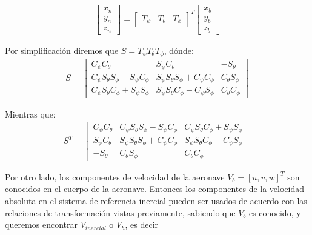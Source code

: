 \begin{gather}
    \begin{bmatrix}
    x_{n}\\
    y_{n}\\
    z_{n}
    \end{bmatrix}
    =
    \begin{bmatrix}
    T_{\psi} & T_{\theta} & T_{\phi} 
    \end{bmatrix} ^T
    \begin{bmatrix}
    x_{b}\\
    y_{b}\\
    z_{b}
    \end{bmatrix}
\end{gather}

Por simplificación diremos que $S = T_{\psi} T_{\theta} T_{\phi}$, dónde:
\begin{gather}
    S
    =
    \begin{bmatrix}
    C_{\psi} C_{\theta} & S_{\psi} C_{\theta} & -S_{\theta}\\
    C_{\psi} S_{\theta} S_{\phi} - S_{\psi} C_{\phi} & S_{\psi} S_{\theta} S_{\phi} + C_{\psi} C_{\phi} & C_{\theta} S_{\phi} \\
    C_{\psi} S_{\theta} C_{\phi} + S_{\psi} S_{\phi} & S_{\psi} S_{\theta} C_{\phi} - C_{\psi} S_{\phi} & C_{\theta} C_{\phi}
    \end{bmatrix}
\end{gather}

Mientras que:
\begin{gather}
    S^T 
    =
    \begin{bmatrix}
    C_{\psi} C_{\theta} & C_{\psi} S_{\theta} S_{\phi} - S_{\psi} C_{\phi} & C_{\psi} S_{\theta} C_{\phi} + S_{\psi} S_{\phi}  \\
    S_{\psi} C_{\theta} &  S_{\psi} S_{\theta} S_{\phi} + C_{\psi} C_{\phi} & S_{\psi} S_{\theta} C_{\phi} - C_{\psi} S_{\phi} \\
    -S_{\theta} & C_{\theta} S_{\phi} & C_{\theta} C_{\phi} 
    \end{bmatrix}
\end{gather}

Por otro lado, los componentes de velocidad de la aeronave $V_b = [u,v,w]^T$ son conocidos en el cuerpo de la aeronave. Entonces los componentes de la velocidad absoluta en el sistema de referencia inercial pueden ser usados de acuerdo con las relaciones de transformación vistas previamente, sabiendo que $V_{b}$ es conocido, y queremos encontrar $V_{inercial}$ o $V_{h}$, es decir

